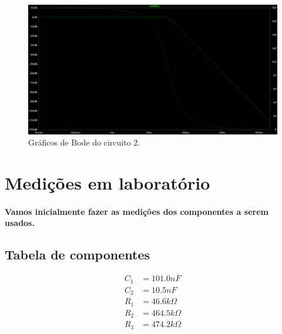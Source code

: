 \documentclass[12pt,twoside, a4paper, twocolumn]{article}
\begin{document}
\begin{figure}[h]
    \centering
    \includegraphics[width=1\columnwidth]{images/LTSPiceH2.png}
    \caption{Gráficos de Bode do circuito 2.}
\end{figure}


\newpage
\section{Medições em laboratório}








\paragraph{Vamos inicialmente fazer as medições dos componentes a serem usados.}








\subsection{Tabela de componentes}








\begin{equation*}
    \begin{aligned}
        C_1 & = 101.0nF           \\
        C_2 & = 10.5nF            \\
        R_1 & = 46.6 k \varOmega  \\
        R_2 & = 464.5 k \varOmega \\
        R_3 & = 474.2 k \varOmega \\
    \end{aligned}
\end{equation*}
\end{document}
